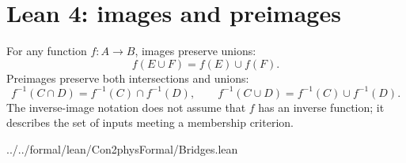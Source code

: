 \section{Lean 4: images and preimages}
\label{sec:lean-bridge-06}
For any function $f:A\to B$, images preserve unions:
\[
f(E\cup F)=f(E)\cup f(F).
\]
Preimages preserve both intersections and unions:
\[
f^{-1}(C\cap D)=f^{-1}(C)\cap f^{-1}(D),\qquad
f^{-1}(C\cup D)=f^{-1}(C)\cup f^{-1}(D).
\]
The inverse-image notation does not assume that $f$ has an inverse
function; it describes the set of inputs meeting a membership criterion.


{../../formal/lean/Con2physFormal/Bridges.lean}
